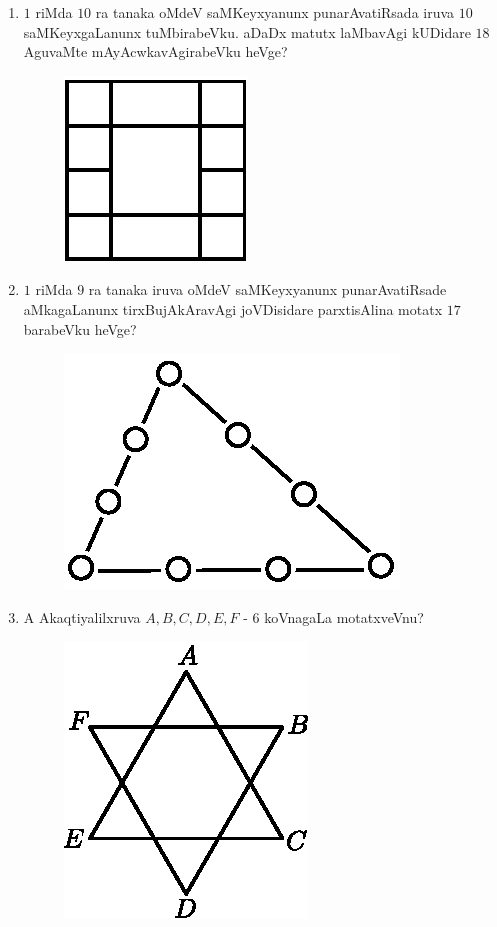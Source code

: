 \begin{enumerate}
\item $1$ riMda $10$ ra tanaka oMdeV saMKeyxyanunx punarAvatiRsada iruva $10$ saMKeyxgaLanunx tuMbirabeVku. aDaDx matutx laMbavAgi kUDidare $18$ AguvaMte mAyAcwkavAgirabeVku heVge?
\begin{figure}[H]
\centering
\includegraphics{src/figures/exr13.eps}
\end{figure}

\item $1$ riMda $9$ ra tanaka iruva oMdeV saMKeyxyanunx punarAvatiRsade aMkagaLanunx tirxBujAkAravAgi joVDisidare parxtisAlina motatx $17$ barabeVku heVge?
\begin{figure}[H]
\centering
\includegraphics{src/figures/exr14.eps}
\end{figure}

\item A Akaqtiyalilxruva $A,B,C,D,E,F$ - $6$ koVnagaLa motatxveVnu?
\begin{figure}[H]
\centering
\includegraphics{src/figures/exr15.eps}
\end{figure}


\end{enumerate}
